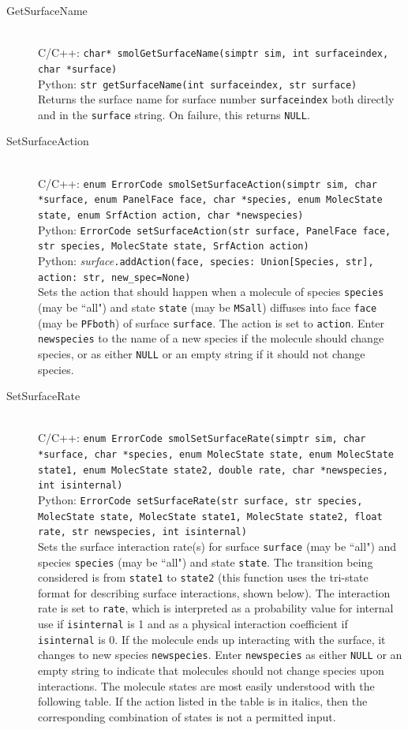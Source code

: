 \documentclass {scrbook}
\newcommand {\ttt} {\texttt}
\begin{document}
\begin{description}
\item[GetSurfaceName]
\hfill \\
C/C++: \ttt{char* smolGetSurfaceName(simptr sim, int surfaceindex, char *surface)}\\
Python: \ttt{str getSurfaceName(int surfaceindex, str surface)}\\
Returns the surface name for surface number \ttt{surfaceindex} both directly and in the \ttt{surface} string. On failure, this returns \ttt{NULL}.

\item[SetSurfaceAction]
\hfill \\
C/C++: \ttt{enum ErrorCode smolSetSurfaceAction(simptr sim, char *surface, enum PanelFace face, char *species, enum MolecState state, enum SrfAction action, char *newspecies)}\\
Python: \ttt{ErrorCode setSurfaceAction(str surface, PanelFace face, str species, MolecState state, SrfAction action)}\\
Python: \textit{surface}\ttt{.addAction(face, species: Union[Species, str], action: str, new\_spec=None)}\\
Sets the action that should happen when a molecule of species \ttt{species} (may be ``all") and state \ttt{state} (may be \ttt{MSall}) diffuses into face \ttt{face} (may be \ttt{PFboth}) of surface \ttt{surface}. The action is set to \ttt{action}. Enter \ttt{newspecies} to the name of a new species if the molecule should change species, or as either \ttt{NULL} or an empty string if it should not change species.

\item[SetSurfaceRate]
\hfill \\
C/C++: \ttt{enum ErrorCode smolSetSurfaceRate(simptr sim, char *surface, char *species, enum MolecState state, enum MolecState state1, enum MolecState state2, double rate, char *newspecies, int isinternal)}\\
Python: \ttt{ErrorCode setSurfaceRate(str surface, str species, MolecState state, MolecState state1, MolecState state2, float rate, str newspecies, int isinternal)}\\
Sets the surface interaction rate(s) for surface \ttt{surface} (may be ``all") and species \ttt{species} (may be ``all") and state \ttt{state}. The transition being considered is from \ttt{state1} to \ttt{state2} (this function uses the tri-state format for describing surface interactions, shown below). The interaction rate is set to \ttt{rate}, which is interpreted as a probability value for internal use if \ttt{isinternal} is 1 and as a physical interaction coefficient if \ttt{isinternal} is 0. If the molecule ends up interacting with the surface, it changes to new species \ttt{newspecies}. Enter \ttt{newspecies} as either \ttt{NULL} or an empty string to indicate that molecules should not change species upon interactions. The molecule states are most easily understood with the following table. If the action listed in the table is in italics, then the corresponding combination of states is not a permitted input.


\end{description}
\end{document}
